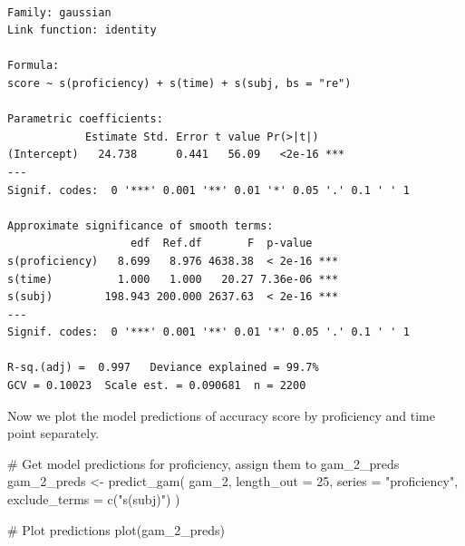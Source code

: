 \documentclass[
  letterpaper,
  DIV=11,
  numbers=noendperiod]{scrartcl}
\newenvironment{Shaded}{\begin{snugshade}}{\end{snugshade}}
\newcommand{\AttributeTok}[1]{\textcolor[rgb]{0.40,0.45,0.13}{#1}}
\newcommand{\CommentTok}[1]{\textcolor[rgb]{0.37,0.37,0.37}{#1}}
\newcommand{\DecValTok}[1]{\textcolor[rgb]{0.68,0.00,0.00}{#1}}
\newcommand{\FunctionTok}[1]{\textcolor[rgb]{0.28,0.35,0.67}{#1}}
\newcommand{\NormalTok}[1]{\textcolor[rgb]{0.00,0.23,0.31}{#1}}
\newcommand{\OtherTok}[1]{\textcolor[rgb]{0.00,0.23,0.31}{#1}}
\newcommand{\StringTok}[1]{\textcolor[rgb]{0.13,0.47,0.30}{#1}}
\begin{document}
\begin{verbatim}

Family: gaussian 
Link function: identity 

Formula:
score ~ s(proficiency) + s(time) + s(subj, bs = "re")

Parametric coefficients:
            Estimate Std. Error t value Pr(>|t|)    
(Intercept)   24.738      0.441   56.09   <2e-16 ***
---
Signif. codes:  0 '***' 0.001 '**' 0.01 '*' 0.05 '.' 0.1 ' ' 1

Approximate significance of smooth terms:
                   edf  Ref.df       F  p-value    
s(proficiency)   8.699   8.976 4638.38  < 2e-16 ***
s(time)          1.000   1.000   20.27 7.36e-06 ***
s(subj)        198.943 200.000 2637.63  < 2e-16 ***
---
Signif. codes:  0 '***' 0.001 '**' 0.01 '*' 0.05 '.' 0.1 ' ' 1

R-sq.(adj) =  0.997   Deviance explained = 99.7%
GCV = 0.10023  Scale est. = 0.090681  n = 2200
\end{verbatim}

Now we plot the model predictions of accuracy score by proficiency and
time point separately.

\begin{Shaded}
\begin{Highlighting}[]
\CommentTok{\# Get model predictions for \textquotesingle{}proficiency\textquotesingle{}, assign them to \textquotesingle{}gam\_2\_preds\textquotesingle{}}
\NormalTok{gam\_2\_preds }\OtherTok{\textless{}{-}} \FunctionTok{predict\_gam}\NormalTok{(}
\NormalTok{  gam\_2, }\AttributeTok{length\_out =} \DecValTok{25}\NormalTok{,}
  \AttributeTok{series =} \StringTok{"proficiency"}\NormalTok{,}
  \AttributeTok{exclude\_terms =} \FunctionTok{c}\NormalTok{(}\StringTok{"s(subj)"}\NormalTok{)}
\NormalTok{)}
\end{Highlighting}
\end{Shaded}

\begin{Shaded}
\begin{Highlighting}[]
\CommentTok{\# Plot predictions}
\FunctionTok{plot}\NormalTok{(gam\_2\_preds)}
\end{Highlighting}
\end{Shaded}
\end{document}
